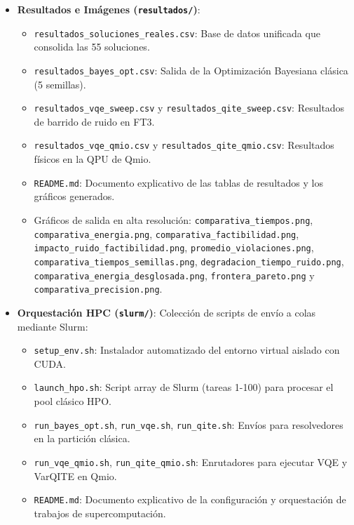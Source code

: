 \begin{itemize}
    \item \textbf{Resultados e Imágenes (\texttt{resultados/})}:
    \begin{itemize}
        \item \texttt{resultados\_soluciones\_reales.csv}: Base de datos unificada que consolida las 55 soluciones.
        \item \texttt{resultados\_bayes\_opt.csv}: Salida de la Optimización Bayesiana clásica (5 semillas).
        \item \texttt{resultados\_vqe\_sweep.csv} y \texttt{resultados\_qite\_sweep.csv}: Resultados de barrido de ruido en FT3.
        \item \texttt{resultados\_vqe\_qmio.csv} y \texttt{resultados\_qite\_qmio.csv}: Resultados físicos en la QPU de Qmio.
        \item \texttt{README.md}: Documento explicativo de las tablas de resultados y los gráficos generados.
        \item Gráficos de salida en alta resolución: \texttt{comparativa\_tiempos.png}, \texttt{comparativa\_energia.png}, \texttt{comparativa\_factibilidad.png}, \texttt{impacto\_ruido\_factibilidad.png}, \texttt{promedio\_violaciones.png}, \texttt{comparativa\_tiempos\_semillas.png}, \texttt{degradacion\_tiempo\_ruido.png}, \texttt{comparativa\_energia\_desglosada.png}, \texttt{frontera\_pareto.png} y \texttt{comparativa\_precision.png}.
    \end{itemize}

    \item \textbf{Orquestación HPC (\texttt{slurm/})}: Colección de scripts de envío a colas mediante Slurm:
    \begin{itemize}
        \item \texttt{setup\_env.sh}: Instalador automatizado del entorno virtual aislado con CUDA.
        \item \texttt{launch\_hpo.sh}: Script array de Slurm (tareas 1-100) para procesar el pool clásico HPO.
        \item \texttt{run\_bayes\_opt.sh}, \texttt{run\_vqe.sh}, \texttt{run\_qite.sh}: Envíos para resolvedores en la partición clásica.
        \item \texttt{run\_vqe\_qmio.sh}, \texttt{run\_qite\_qmio.sh}: Enrutadores para ejecutar VQE y VarQITE en Qmio.
        \item \texttt{README.md}: Documento explicativo de la configuración y orquestación de trabajos de supercomputación.
    \end{itemize}


\end{itemize}
